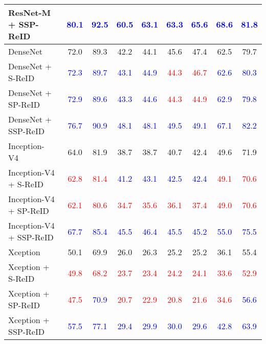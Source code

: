 \documentclass[final,3p,times,twocolumn]{elsarticle}
\begin{document}
\begin{table*}[!htb]
\begin{tabular}{lcccccccc}
ResNet-M + SSP-ReID & \textcolor{blue}{80.1} & \textcolor{blue}{92.5} & \textcolor{blue}{60.5} & \textcolor{blue}{63.1} & \textcolor{blue}{63.3} & \textcolor{blue}{65.6} & \textcolor{blue}{68.6} & \textcolor{blue}{81.8} \\
\midrule
DenseNet~\cite{huang2017densely} & 72.0 & 89.3 & 42.2& 44.1 & 45.6 & 47.4 & 62.5 & 79.7 \\
DenseNet + S-ReID    & \textcolor{blue}{72.3} & \textcolor{blue}{89.7} & \textcolor{blue}{43.1} & \textcolor{blue}{44.9} & \textcolor{red}{44.3} & \textcolor{red}{46.7} & \textcolor{blue}{62.6} & \textcolor{blue}{80.3} \\
DenseNet + SP-ReID   & \textcolor{blue}{72.9} & \textcolor{blue}{89.6} & \textcolor{blue}{43.3} & \textcolor{blue}{44.6} & \textcolor{red}{44.3} & \textcolor{red}{44.9} & \textcolor{blue}{62.9} & \textcolor{blue}{79.8} \\
DenseNet + SSP-ReID  & \textcolor{blue}{76.7} & \textcolor{blue}{90.9} & \textcolor{blue}{48.1} & \textcolor{blue}{48.1} & \textcolor{blue}{49.5} & \textcolor{blue}{49.1} & \textcolor{blue}{67.1} & \textcolor{blue}{82.2} \\
\midrule
Inception-V4~\cite{szegedy2017inception} & 64.0 & 81.9 & 38.7 & 38.7 & 40.7 & 42.4 & 49.6 & 71.9 \\
Inception-V4 + S-ReID     & \textcolor{red}{62.8} & \textcolor{red}{81.4} & \textcolor{blue}{41.2} & \textcolor{blue}{43.1} & \textcolor{blue}{42.5} & \textcolor{blue}{42.4} & \textcolor{red}{49.1} & \textcolor{red}{70.6} \\
Inception-V4 + SP-ReID    & \textcolor{red}{62.1} & \textcolor{red}{80.6} & \textcolor{red}{34.7} & \textcolor{red}{35.6} & \textcolor{red}{36.1} & \textcolor{red}{37.4} & \textcolor{red}{49.0} & \textcolor{red}{70.6} \\
Inception-V4 + SSP-ReID   & \textcolor{blue}{67.7} & \textcolor{blue}{85.4} & \textcolor{blue}{45.5} & \textcolor{blue}{46.4} & \textcolor{blue}{45.5} & \textcolor{blue}{45.2} & \textcolor{blue}{55.0} & \textcolor{blue}{75.5} \\
\midrule
Xception~\cite{chollet2016xception} & 50.1 & 69.9 & 26.0 & 26.3 & 25.2 & 25.2 & 36.1 & 55.4 \\
Xception + S-ReID     & \textcolor{red}{49.8} & \textcolor{red}{68.2} & \textcolor{red}{23.7} & \textcolor{red}{23.4} & \textcolor{red}{24.2} & \textcolor{red}{24.1} & \textcolor{red}{33.6} & \textcolor{red}{52.9} \\
Xception + SP-ReID    & \textcolor{red}{47.5} & \textcolor{blue}{70.9} & \textcolor{red}{20.7} & \textcolor{red}{22.9} & \textcolor{red}{20.8} & \textcolor{red}{21.6} & \textcolor{red}{34.6} & \textcolor{blue}{56.6} \\
Xception + SSP-ReID   & \textcolor{blue}{57.5} & \textcolor{blue}{77.1} & \textcolor{blue}{29.4} & \textcolor{blue}{29.9} & \textcolor{blue}{30.0} & \textcolor{blue}{29.6} & \textcolor{blue}{42.8} & \textcolor{blue}{63.9} \\
\bottomrule
\end{tabular}
\end{table*}
\end{document}
